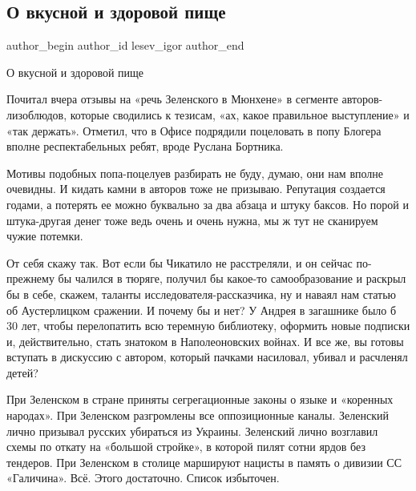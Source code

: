  
 
 
 
 
 
\subsection{О вкусной и здоровой пище}
\label{sec:20_02_2022.tg.lesev_igor.1.o_vkusnoj_i_zdorovoj_pische}
 
\ifcmt
 author_begin
   author_id lesev_igor
 author_end
\fi

О вкусной и здоровой пище

Почитал вчера отзывы на «речь Зеленского в Мюнхене» в сегменте
авторов-лизоблюдов, которые сводились к тезисам, «ах, какое правильное
выступление» и «так держать». Отметил, что в Офисе подрядили поцеловать в попу
Блогера вполне респектабельных ребят, вроде Руслана Бортника.

Мотивы подобных попа-поцелуев разбирать не буду, думаю, они нам вполне
очевидны. И кидать камни в авторов тоже не призываю. Репутация создается
годами, а потерять ее можно буквально за два абзаца и штуку баксов. Но порой и
штука-другая денег тоже ведь очень и очень нужна, мы ж тут не сканируем чужие
потемки.

От себя скажу так. Вот если бы Чикатило не расстреляли, и он сейчас по-прежнему
бы чалился в тюряге, получил бы какое-то самообразование и раскрыл бы в себе,
скажем, таланты исследователя-рассказчика, ну и наваял нам статью об
Аустерлицком сражении. И почему бы и нет? У Андрея в загашнике было б 30 лет,
чтобы перелопатить всю теремную библиотеку, оформить новые подписки и,
действительно, стать знатоком в Наполеоновских войнах. И все же, вы готовы
вступать в дискуссию с автором, который пачками насиловал, убивал и расчленял
детей?

При Зеленском в стране приняты сегрегационные законы о языке и «коренных
народах». При Зеленском разгромлены все оппозиционные каналы. Зеленский лично
призывал русских убираться из Украины. Зеленский лично возглавил схемы по
откату на «большой стройке», в которой пилят сотни ярдов без тендеров. При
Зеленском в столице маршируют нацисты в память о дивизии СС «Галичина». Всё.
Этого достаточно. Список избыточен.

